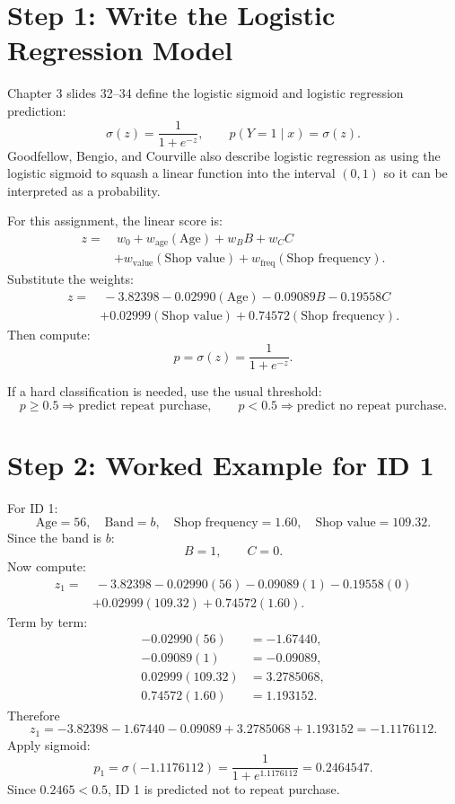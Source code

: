 \documentclass[11pt]{article}
\begin{document}
\section*{Step 1: Write the Logistic Regression Model}

Chapter 3 slides 32--34 define the logistic sigmoid and logistic regression prediction:
\[
\sigma(z)=\frac{1}{1+e^{-z}},
\qquad
p(Y=1\mid x)=\sigma(z).
\]
Goodfellow, Bengio, and Courville also describe logistic regression as using the logistic sigmoid to squash a linear function into the interval $(0,1)$ so it can be interpreted as a probability.

For this assignment, the linear score is:
\[
\begin{aligned}
z
=&\ w_0+w_{\text{age}}(\text{Age})
+w_B B+w_C C\\
&+w_{\text{value}}(\text{Shop value})
+w_{\text{freq}}(\text{Shop frequency}).
\end{aligned}
\]
Substitute the weights:
\[
\begin{aligned}
z
=&\ -3.82398-0.02990(\text{Age})
-0.09089B-0.19558C\\
&+0.02999(\text{Shop value})
+0.74572(\text{Shop frequency}).
\end{aligned}
\]
Then compute:
\[
p=\sigma(z)=\frac{1}{1+e^{-z}}.
\]

If a hard classification is needed, use the usual threshold:
\[
p\ge 0.5 \Rightarrow \text{predict repeat purchase},
\qquad
p<0.5 \Rightarrow \text{predict no repeat purchase}.
\]

\section*{Step 2: Worked Example for ID 1}

For ID 1:
\[
\text{Age}=56,\quad \text{Band}=b,\quad \text{Shop frequency}=1.60,\quad \text{Shop value}=109.32.
\]
Since the band is $b$:
\[
B=1,\qquad C=0.
\]
Now compute:
\[
\begin{aligned}
z_1
=&\ -3.82398-0.02990(56)-0.09089(1)-0.19558(0)\\
&+0.02999(109.32)+0.74572(1.60).
\end{aligned}
\]
Term by term:
\[
\begin{aligned}
-0.02990(56)&=-1.67440,\\
-0.09089(1)&=-0.09089,\\
0.02999(109.32)&=3.2785068,\\
0.74572(1.60)&=1.193152.
\end{aligned}
\]
Therefore
\[
z_1=-3.82398-1.67440-0.09089+3.2785068+1.193152=-1.1176112.
\]
Apply sigmoid:
\[
p_1=\sigma(-1.1176112)
=\frac{1}{1+e^{1.1176112}}
=0.2464547.
\]
Since $0.2465<0.5$, ID 1 is predicted not to repeat purchase.
\end{document}
